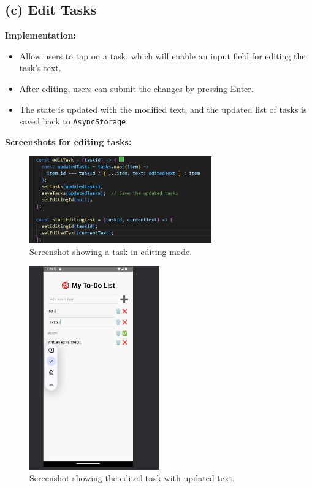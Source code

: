 \documentclass[12pt]{article}
\begin{document}
\subsection*{(c) Edit Tasks }
\textbf{Implementation:}  
\begin{itemize}[left=1.5em]
    \item Allow users to tap on a task, which will enable an input field for editing the task's text.
    \item After editing, users can submit the changes by pressing Enter.
    \item The state is updated with the modified text, and the updated list of tasks is saved back to \texttt{AsyncStorage}.
\end{itemize}

\textbf{Screenshots for editing tasks:}  
\begin{figure}[H]
    \centering
    \includegraphics[width=0.7\textwidth]{images/edittask1.png} 
    \caption{Screenshot showing a task in editing mode.}
    \label{fig:edit-task-start}
\end{figure}
\begin{figure}[H]
    \centering
    \includegraphics[width=0.5\textwidth]{images/edittask3.png} 
    \caption{Screenshot showing the edited task with updated text.}
    \label{fig:edit-task-complete}
\end{figure}
\end{document}
